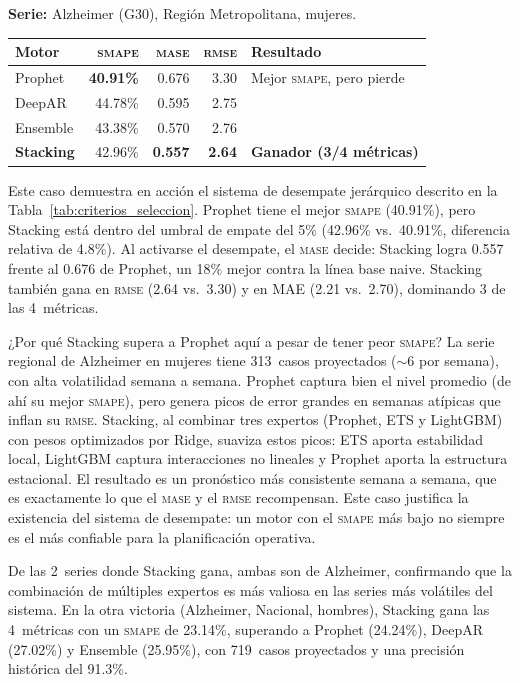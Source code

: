 \documentclass[12pt, letterpaper]{article}
\newcommand{\smape}{\textnormal{\textsc{smape}}}
\newcommand{\mase}{\textnormal{\textsc{mase}}}
\newcommand{\rmse}{\textnormal{\textsc{rmse}}}
\newcommand{\tabref}[1]{Tabla~\ref{#1}}
\begin{document}
\textbf{Serie:} Alzheimer (G30), Región Metropolitana, mujeres.

\begin{table}[H]
\centering
\small
\begin{tabularx}{\textwidth}{X r r r l}
\toprule
\textbf{Motor} & \textbf{\smape{}} & \textbf{\mase{}} & \textbf{\rmse{}} & \textbf{Resultado} \\
\midrule
Prophet & \textbf{40.91\%} & 0.676 & 3.30 & Mejor \smape{}, pero pierde \\
DeepAR & 44.78\% & 0.595 & 2.75 & \\
Ensemble & 43.38\% & 0.570 & 2.76 & \\
\rowcolor{lightgreen} \textbf{Stacking} & 42.96\% & \textbf{0.557} & \textbf{2.64} & \textbf{Ganador (3/4 métricas)} \\
\bottomrule
\end{tabularx}
\end{table}

Este caso demuestra en acción el sistema de desempate jerárquico descrito en la \tabref{tab:criterios_seleccion}. Prophet tiene el mejor \smape{} (40.91\%), pero Stacking está dentro del umbral de empate del 5\% (42.96\% vs.\ 40.91\%, diferencia relativa de 4.8\%). Al activarse el desempate, el \mase{} decide: Stacking logra 0.557 frente al 0.676 de Prophet, un 18\% mejor contra la línea base naive. Stacking también gana en \rmse{} (2.64 vs.\ 3.30) y en MAE (2.21 vs.\ 2.70), dominando 3 de las 4~métricas.

¿Por qué Stacking supera a Prophet aquí a pesar de tener peor \smape{}? La serie regional de Alzheimer en mujeres tiene 313~casos proyectados ($\sim$6 por semana), con alta volatilidad semana a semana. Prophet captura bien el nivel promedio (de ahí su mejor \smape{}), pero genera picos de error grandes en semanas atípicas que inflan su \rmse{}. Stacking, al combinar tres expertos (Prophet, ETS y LightGBM) con pesos optimizados por Ridge, suaviza estos picos: ETS aporta estabilidad local, LightGBM captura interacciones no lineales y Prophet aporta la estructura estacional. El resultado es un pronóstico más consistente semana a semana, que es exactamente lo que el \mase{} y el \rmse{} recompensan. Este caso justifica la existencia del sistema de desempate: un motor con el \smape{} más bajo no siempre es el más confiable para la planificación operativa.

De las 2~series donde Stacking gana, ambas son de Alzheimer, confirmando que la combinación de múltiples expertos es más valiosa en las series más volátiles del sistema. En la otra victoria (Alzheimer, Nacional, hombres), Stacking gana las 4~métricas con un \smape{} de 23.14\%, superando a Prophet (24.24\%), DeepAR (27.02\%) y Ensemble (25.95\%), con 719~casos proyectados y una precisión histórica del 91.3\%.
\end{document}
